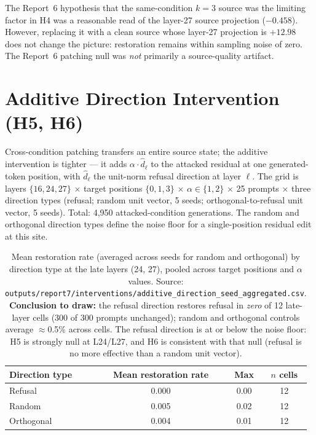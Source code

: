 \documentclass{article}
\begin{document}
The Report~6 hypothesis that the same-condition $k=3$ source was the
limiting factor in H4 was a reasonable read of the layer-27 source
projection ($-0.458$). However, replacing it with a clean source whose
layer-27 projection is $+12.98$ does not change the picture: restoration
remains within sampling noise of zero. The Report~6 patching null was
\emph{not} primarily a source-quality artifact.

\FloatBarrier

\section{Additive Direction Intervention (H5, H6)}
\label{sec:additive}

Cross-condition patching transfers an entire source state; the additive
intervention is tighter --- it adds $\alpha\cdot\hat{d}_\ell$ to the
attacked residual at one generated-token position, with $\hat{d}_\ell$ the
unit-norm refusal direction at layer $\ell$. The grid is layers
$\{16, 24, 27\}$ $\times$ target positions $\{0, 1, 3\}$ $\times$
$\alpha\in\{1, 2\}$ $\times$ 25 prompts $\times$ three direction types
(refusal; random unit vector, 5 seeds; orthogonal-to-refusal unit vector,
5 seeds). Total: 4{,}950 attacked-condition generations. The random and
orthogonal direction types define the noise floor for a single-position
residual edit at this site.

\begin{table}[h]
\centering
\small
\caption{Mean restoration rate (averaged across seeds for random and
orthogonal) by direction type at the late layers (24, 27), pooled across
target positions and $\alpha$ values. Source:
\texttt{outputs/report7/interventions/additive\_direction\_seed\_aggregated.csv}.
\textbf{Conclusion to draw:} the refusal direction restores refusal in
\emph{zero} of 12 late-layer cells (300 of 300 prompts unchanged); random
and orthogonal controls average $\approx$0.5\% across cells. The refusal
direction is at or below the noise floor: H5 is strongly null at L24/L27,
and H6 is consistent with that null (refusal is no more effective than a
random unit vector).}
\label{tab:additive-by-type}
\begin{tabular}{lccc}
\toprule
Direction type & Mean restoration rate & Max & $n$ cells \\
\midrule
Refusal    & 0.000 & 0.00 & 12 \\
Random     & 0.005 & 0.02 & 12 \\
Orthogonal & 0.004 & 0.01 & 12 \\
\bottomrule
\end{tabular}
\end{table}
\end{document}

